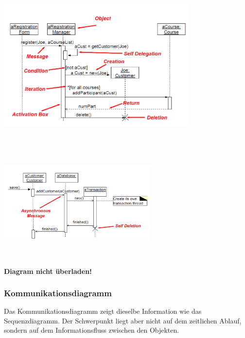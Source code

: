 \begin{minipage}[hbt]{1cm}
	\centering
	\includegraphics[height=8cm, width = 10cm,]{images/Modellierung/Sequenzdiagramm}
	\label{Bild1}
\end{minipage}
\hfill
\begin{minipage}[hbt]{8cm}
	\centering
	\includegraphics[height=6cm, width = 8cm,]{images/Modellierung/Sequenzdiagramm2}
	\label{Bild2}
\end{minipage}

\textbf{Diagram nicht überladen!} 

\newpage
\subsubsection{Kommunikationsdiagramm }
Das Kommunikationsdiagramm zeigt dieselbe Information wie das Sequenzdiagramm. Der Schwerpunkt liegt aber
nicht auf dem zeitlichen Ablauf, sondern auf dem Informationsfluss zwischen den Objekten.

